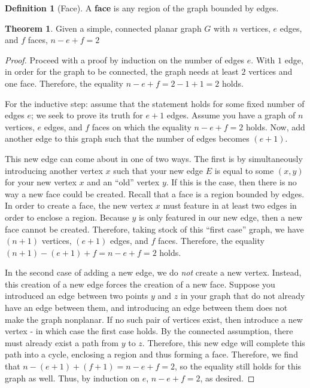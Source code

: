\documentclass{scrippsthesisclass}
\theoremstyle{definition}
\newtheorem{defn}{Definition}[section]
\newtheorem{theorem}{Theorem}[section]
\begin{document}
\begin{defn}[Face]
    A \textbf{face} is any region of the graph bounded by edges.
\end{defn}

\begin{theorem}
    Given a simple, connected planar graph $G$ with $n$ vertices, $e$ edges, and $f$ faces, $n - e + f = 2$
\end{theorem}
\begin{proof}
    Proceed with a proof by induction on the number of edges $e$. 
    With $1$ edge, in order for the graph to be connected, the graph needs at least $2$ vertices and one face. 
    Therefore, the equality $n - e + f = 2 - 1 + 1 = 2$ holds. 
    
    For the inductive step: assume that the statement holds for some fixed number of edges $e$; we seek to prove its truth for $e + 1$ edges. 
    Assume you have a graph of $n$ vertices, $e$ edges, and $f$ faces on which the equality $n - e + f = 2$ holds. 
    Now, add another edge to this graph such that the number of edges becomes $(e + 1)$. 
    
    This new edge can come about in one of two ways. 
    The first is by simultaneously introducing another vertex $x$ such that your new edge $E$ is equal to some $(x, y)$ for your new vertex $x$ and an ``old'' vertex $y$. 
    If this is the case, then there is no way a new face could be created. 
    Recall that a face is a region bounded by edges. 
    In order to create a face, the new vertex $x$ must feature in at least two edges in order to enclose a region. 
    Because $y$ is only featured in our new edge, then a new face cannot be created. 
    Therefore, taking stock of this ``first case'' graph, we have $(n+1)$ vertices, $(e + 1)$ edges, and $f$ faces. 
    Therefore, the equality $(n + 1) - (e + 1) + f = n - e + f = 2$ holds. 

    In the second case of adding a new edge, we do \textit{not} create a new vertex. 
    Instead, this creation of a new edge forces the creation of a new face.
    Suppose you introduced an edge between two points $y$ and $z$ in your graph that do not already have an edge between them, and introducing an edge between them does not make the graph nonplanar.
    If no such pair of vertices exist, then introduce a new vertex - in which case the first case holds. 
    By the connected assumption, there must already exist a path from $y$ to $z$. 
    Therefore, this new edge will complete this path into a cycle, enclosing a region and thus forming a face. 
    Therefore, we find that $n - (e + 1) + (f + 1) = n - e + f = 2$, so the equality still holds for this graph as well. 
    Thus, by induction on $e$, $n - e + f = 2$, as desired. 
\end{proof}
\end{document}
